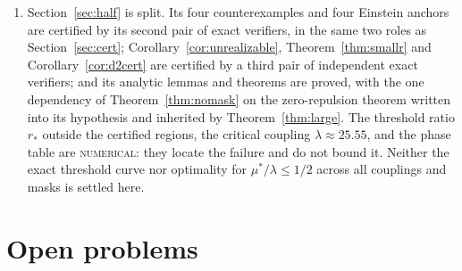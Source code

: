 \documentclass[11pt]{article}
\newcommand{\muS}{\mu^{*}}
\theoremstyle{definition}
\theoremstyle{remark}
\begin{document}
\begin{enumerate}[label=(\arabic*),leftmargin=2.2em]
subtracted kernel, or a frequency-dependent pseudopotential is outside this model and can
change the rank-one structure of Proposition~\ref{prop:rank}, which is what both
Corollary~\ref{cor:value} and the mechanism of Remark~\ref{rem:mech} rest on.
\item Section~\ref{sec:half} is split. Its four counterexamples and four Einstein anchors
are certified by its second pair of exact verifiers, in the same two roles as
Section~\ref{sec:cert}; Corollary~\ref{cor:unrealizable}, Theorem~\ref{thm:smallr} and
Corollary~\ref{cor:d2cert} are certified by a third pair of
independent exact verifiers; and its analytic lemmas and theorems are proved, with the one
dependency of Theorem~\ref{thm:nomask} on the zero-repulsion theorem written into its
hypothesis and inherited by Theorem~\ref{thm:large}. The threshold ratio $r_*$ outside the
certified regions, the critical coupling $\lambda\approx25.55$, and the phase table are
\textsc{numerical}: they locate the failure and do not bound it. Neither the exact
threshold curve nor optimality for $\muS/\lambda\le1/2$ across all couplings and masks is
settled here.
\end{enumerate}

\section{Open problems}\label{sec:open}
\end{document}
